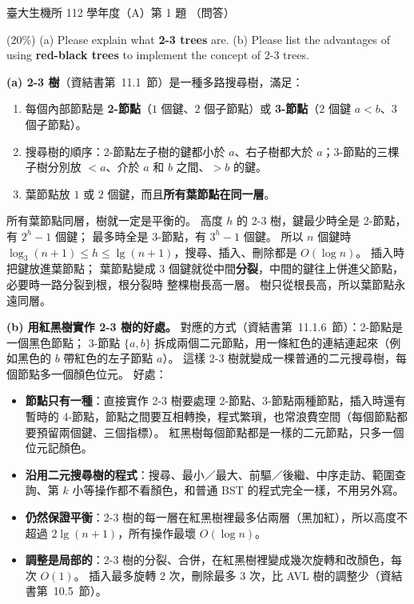 \begin{pastexam}[label={px:ntu-112-bime-ds-01}]{臺大生機所 112 學年度（A）第 1 題}
（問答）

(20\%) (a) Please explain what \textbf{2-3 trees} are. (b) Please list the advantages of using
\textbf{red-black trees} to implement the concept of 2-3 trees.
\end{pastexam}

\begin{pastsoln}
\textbf{(a) 2-3 樹}（資結書第~11.1~節）是一種多路搜尋樹，滿足：
\begin{enumerate}
\item 每個內部節點是 \textbf{2-節點}（$1$ 個鍵、$2$ 個子節點）或 \textbf{3-節點}（$2$ 個鍵
$a < b$、$3$ 個子節點）。
\item 搜尋樹的順序：2-節點左子樹的鍵都小於 $a$、右子樹都大於 $a$；3-節點的三棵子樹分別放
$< a$、介於 $a$ 和 $b$ 之間、$> b$ 的鍵。
\item 葉節點放 $1$ 或 $2$ 個鍵，而且\textbf{所有葉節點在同一層}。
\end{enumerate}
所有葉節點同層，樹就一定是平衡的。 高度 $h$ 的 2-3 樹，鍵最少時全是 2-節點，有 $2^h - 1$ 個鍵；
最多時全是 3-節點，有 $3^h - 1$ 個鍵。 所以 $n$ 個鍵時
$\log_3(n + 1) \le h \le \lg(n + 1)$，搜尋、插入、刪除都是 $O(\log n)$。 插入時把鍵放進葉節點；
葉節點變成 $3$ 個鍵就從中間\textbf{分裂}，中間的鍵往上併進父節點，必要時一路分裂到根，根分裂時
整棵樹長高一層。 樹只從根長高，所以葉節點永遠同層。

\textbf{(b) 用紅黑樹實作 2-3 樹的好處。} 對應的方式（資結書第~11.1.6~節）：2-節點是一個黑色節點；
3-節點 $\{a, b\}$ 拆成兩個二元節點，用一條紅色的連結連起來（例如黑色的 $b$ 帶紅色的左子節點
$a$）。 這樣 2-3 樹就變成一棵普通的二元搜尋樹，每個節點多一個顏色位元。 好處：
\begin{itemize}
\item \textbf{節點只有一種}：直接實作 2-3 樹要處理 2-節點、3-節點兩種節點，插入時還有暫時的
4-節點，節點之間要互相轉換，程式繁瑣，也常浪費空間（每個節點都要預留兩個鍵、三個指標）。
紅黑樹每個節點都是一樣的二元節點，只多一個位元記顏色。
\item \textbf{沿用二元搜尋樹的程式}：搜尋、最小／最大、前驅／後繼、中序走訪、範圍查詢、第 $k$
小等操作都不看顏色，和普通 BST 的程式完全一樣，不用另外寫。
\item \textbf{仍然保證平衡}：2-3 樹的每一層在紅黑樹裡最多佔兩層（黑加紅），所以高度不超過
$2\lg(n + 1)$，所有操作最壞 $O(\log n)$。
\item \textbf{調整是局部的}：2-3 樹的分裂、合併，在紅黑樹裡變成幾次旋轉和改顏色，每次 $O(1)$。
插入最多旋轉 $2$ 次，刪除最多 $3$ 次，比 AVL 樹的調整少（資結書第~10.5~節）。
\end{itemize}
\end{pastsoln}
